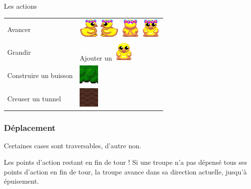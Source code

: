 \documentclass[table]{beamer}
\begin{document}
\begin{frame}{Les actions}
    \begin{center}
    \begin{tabular}{M{3cm} M{8cm}}
        Avancer &
        \includegraphics[width=1cm]{img/sprite/ducks/duck_E_1.png} 
        \includegraphics[width=1cm]{img/sprite/ducks/duck_W_1.png} 
        \includegraphics[width=1cm]{img/sprite/ducks/duck_N_1.png} 
        \includegraphics[width=1cm]{img/sprite/ducks/duck_S_1.png} \\
        Grandir & Ajouter un \includegraphics[width=1cm]{img/sprite/ducks/duckling_S_1.png} \\
        Construire un buisson & \includegraphics[width=1cm]{img/sprite/buisson.png} \\
        Creuser un tunnel & \includegraphics[width=1cm]{img/sprite/dirt.png} \\
    \end{tabular}
    \end{center}
\end{frame}

\begin{frame}
    \frametitle{Déplacement}
    Certaines cases sont traversables, d'autre non.
    \begin{center}
    \end{center}
    
    \begin{block}{Les points d'action restant en fin de tour !}
    Si une troupe n'a pas dépensé tous ses points d'action en fin de tour, la troupe avance dans sa direction actuelle, jusqu'à épuisement.
    \end{block}
\end{frame}
\end{document}
